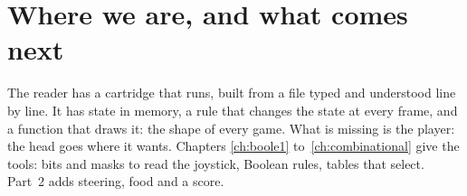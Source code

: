 \section{Where we are, and what comes next}

The reader has a cartridge that runs, built from a file typed and understood
line by line. It has state in memory, a rule that changes the state at every
frame, and a function that draws it: the shape of every game. What is missing
is the player: the head goes where it wants. Chapters \ref{ch:boole1}
to~\ref{ch:combinational} give the tools: bits and masks to read the joystick,
Boolean rules, tables that select. Part~2 adds steering, food and a score.

